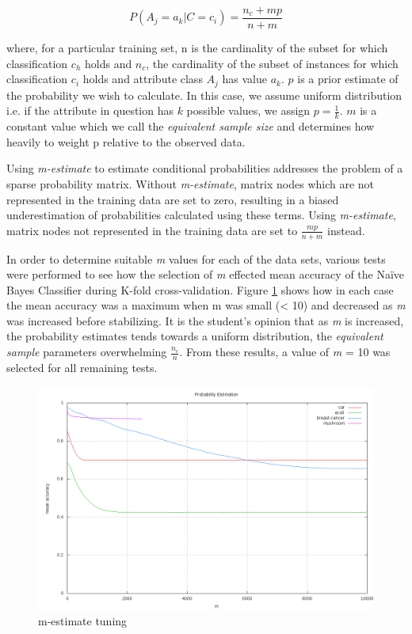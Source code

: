 \documentclass[10pt]{report}
\begin{document}
\begin{equation*}
P(A_{j}=a_{k}|C=c_{i}) = \frac{n_{c} + mp}{n + m}
\end{equation*}

where, for a particular training set, n is the cardinality of the
subset for which classification \(c_h\) holds and \(n_c\), the
cardinality of the subset of instances for which classification
\(c_i\) holds and attribute class \(A_j\) has value \(a_k\). \(p\) is
a prior estimate of the probability we wish to calculate. In this
case, we assume uniform distribution i.e. if the attribute in question
has \(k\) possible values, we assign \(p = \frac{1}{k}\). \(m\) is a
constant value which we call the \textit{equivalent sample size} and
determines how heavily to weight p relative to the observed
data. 

Using \textit{m-estimate} to estimate conditional probabilities
addresses the problem of a sparse probability matrix. Without
\textit{m-estimate}, matrix nodes which are not represented in the
training data are set to zero, resulting in a biased underestimation
of probabilities calculated using these terms. Using
\textit{m-estimate}, matrix nodes not represented in the training data
are set to \(\frac{mp}{n + m}\) instead.

In order to determine suitable \textit{m} values for each of the data
sets, various tests were performed to see how the selection of
\textit{m} effected mean accuracy of the Na\"{i}ve Bayes Classifier
during K-fold cross-validation. Figure \ref{fig:mlog} shows how in
each case the mean accuracy was a maximum when m was small (< 10) and
decreased as \textit{m} was increased before stabilizing. It is the
student's opinion that as \textit{m} is increased, the probability
estimates tends towards a uniform distribution, the \textit{equivalent sample}
parameters overwhelming \(\frac{n_c}{n}\). From these results, a value
of \textit{m} = 10 was selected for all remaining tests.

\begin{figure}
  \begin{center}
	\includegraphics[width=\textwidth,height=!]{mlog}
  \end{center}
  \caption{m-estimate tuning}
  \label{fig:mlog}
\end{figure} 
\end{document}
